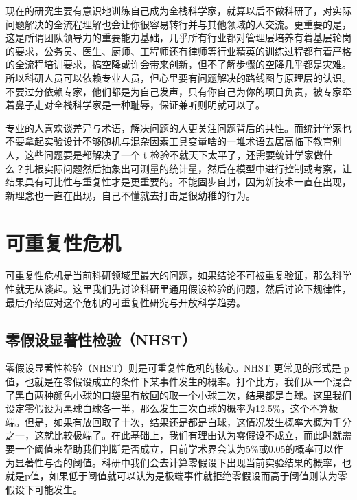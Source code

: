 \documentclass[]{tufte-book}
\begin{document}
现在的研究生要有意识地训练自己成为全栈科学家，就算以后不做科研了，对实际问题解决的全流程理解也会让你很容易转行并与其他领域的人交流。更重要的是，这是所谓团队领导力的重要能力基础，几乎所有行业都对管理层培养有着基层轮岗的要求，公务员、医生、厨师、工程师还有律师等行业精英的训练过程都有着严格的全流程培训要求，搞空降或许会带来创新，但不了解步骤的空降几乎都是灾难。所以科研人员可以依赖专业人员，但心里要有问题解决的路线图与原理层的认识。不要过分依赖专家，他们都是为自己发声，只有你自己为你的项目负责，被专家牵着鼻子走对全栈科学家是一种耻辱，保证兼听则明就可以了。

专业的人喜欢谈差异与术语，解决问题的人更关注问题背后的共性。而统计学家也不要拿起实验设计不够随机与混杂因素工具变量啥的一堆术语去居高临下教育别人，这些问题要是都解决了一个 t 检验不就天下太平了，还需要统计学家做什么？扎根实际问题然后抽象出可测量的统计量，然后在模型中进行控制或考察，让结果具有可比性与重复性才是更重要的。不能固步自封，因为新技术一直在出现，新理念也一直在出现，自己不懂就去打击是很幼稚的行为。

\hypertarget{ux53efux91cdux590dux6027ux5371ux673a}{%
\section{可重复性危机}\label{ux53efux91cdux590dux6027ux5371ux673a}}

可重复性危机是当前科研领域里最大的问题，如果结论不可被重复验证，那么科学性就无从谈起。这里我们先讨论科研里通用假设检验的问题，然后讨论下规律性，最后介绍应对这个危机的可重复性研究与开放科学趋势。

\hypertarget{ux96f6ux5047ux8bbeux663eux8457ux6027ux68c0ux9a8cnhst}{%
\subsection{零假设显著性检验（NHST）}\label{ux96f6ux5047ux8bbeux663eux8457ux6027ux68c0ux9a8cnhst}}

零假设显著性检验（NHST）则是可重复性危机的核心。NHST 更常见的形式是 p 值，也就是在零假设成立的条件下某事件发生的概率。打个比方，我们从一个混合了黑白两种颜色小球的口袋里有放回的取一个小球三次，结果都是白球。这里我们设定零假设为黑球白球各一半，那么发生三次白球的概率为12.5\%，这个不算极端。但是，如果有放回取了十次，结果还是都是白球，这情况发生概率大概为千分之一，这就比较极端了。在此基础上，我们有理由认为零假设不成立，而此时就需要一个阈值来帮助我们判断是否成立，目前学术界会认为5\%或0.05的概率可以作为显著性与否的阈值。科研中我们会去计算零假设下出现当前实验结果的概率，也就是p值，如果低于阈值就可以认为是极端事件就拒绝零假设而高于阈值则认为零假设下可能发生。
\end{document}
